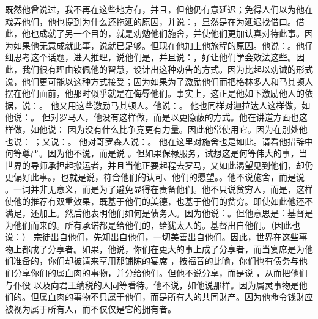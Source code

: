 既然他曾说过，我不再在这些地方有，并且，但他仍有意延迟；免得人们以为他在戏弄他们，他也提到为什么还拖延的原因，并说：，显然是在为延迟找借口。借此，他也成就了另一个目的，就是劝勉他们施舍，并使他们更加认真对待此事。因为如果他无意成就此事，说就已足够。但现在他加上他旅程的原因。他说：。他仔细思考这个话题，进入推理，说他们是，并且说：，好让他们学会效法这些。因此，我们很有理由钦佩他的智慧，设计出这种劝告的方式。因为比起以劝诫的形式说，他们更可能以这种方式接受；因为如果为了激励他们而把格林多人和马其顿人摆在他们面前，他那时似乎就是在侮辱他们。事实上，这正是他如下激励他人的依据，说：。 他又用这些激励马其顿人。他说：。 他也同样对迦拉达人这样做，如他说：。 但对罗马人，他没有这样做，而是以更隐蔽的方式。他在讲道方面也这样做，如他说：  因为没有什么比争竞更有力量。因此他常使用它。因为在别处他也说： ；又说：。 他对哥罗森人说：。 他在这里对施舍也是如此。请看他措辞中何等尊严。因为他不说，而是说 。但如果保禄服务，试想这是何等伟大的事，当世界的导师承担起搬运者，并且当他正要起程去罗马，又如此渴望见到他们，却仍更偏好此事。，也就是说，符合他们的认可、他们的愿望。。他不说施舍，而是说 。一词并非无意义，而是为了避免显得在责备他们。他不只说贫穷人，而是，这样使他的推荐有双重效果，既基于他们的美德，也基于他们的贫穷。即使如此他还不满足，还加上。然后他表明他们如何是债务人。因为他说：。但他意思是：基督是为他们而来的。所有承诺都是给他们的，给犹太人的。基督出自他们。（因此也说：） 宗徒出自他们，先知出自他们，一切美善出自他们。因此，世界在这些事物上都成了分享者。如果，他说，你们在更大的事上成了分享者，而当宴席是为他们准备的，你们却被请来享用那铺陈的宴席 ，按福音的比喻，你们也有债务与他们分享你们的属血肉的事物，并分给他们。但他不说分享，而是说 ，从而把他们与仆役  以及向君王纳税的人同等看待。他不说，如他说那样。因为属灵事物是他们的。但属血肉的事物不只属于他们，而是所有人的共同财产。因为他命令钱财应被视为属于所有人，而不仅仅是它的拥有者。\par

